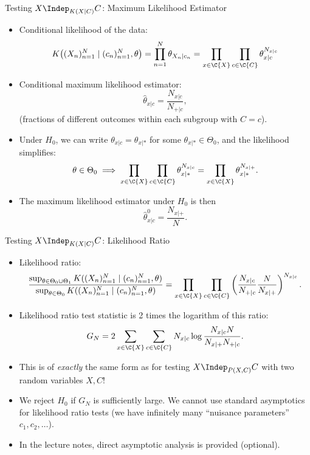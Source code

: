 \begin{frame}{Testing $X \Indep_{K(X|C)} C$: Maximum Likelihood Estimator}
  \begin{itemize}
    \item Conditional likelihood of the data:
      $$K\big((X_n)_{n=1}^N \mid (c_n)_{n=1}^N, \theta\big)
      = \prod_{n=1}^N \theta_{X_n|c_n} 
      = \prod_{x\in\C{X}} \prod_{c\in\C{C}} \theta_{x|c}^{N_{x|c}}$$
    \item Conditional maximum likelihood estimator:
      $$\hat \theta_{x|c} = \frac{N_{x|c}}{N_{+|c}},$$
      (fractions of different outcomes within each subgroup with $C = c$).
    \item Under $H_0$, we can write $\theta_{x|c} = \theta_{x|\ast}$ for some $\theta_{x|\ast} \in \Theta_0$, 
      and the likelihood simplifies:
      $$\theta \in \Theta_0 \implies \prod_{x\in\C{X}} \prod_{c\in\C{C}} \theta_{x|\ast}^{N_{x|c}} = \prod_{x\in\C{X}} \theta_{x|\ast}^{N_{x|+}}.$$
    \item The maximum likelihood estimator under $H_0$ is then
$$\hat \theta^0_{x|c} = \frac{N_{x|+}}{N}.$$
  \end{itemize}
\end{frame}
 
\begin{frame}{Testing $X \Indep_{K(X|C)} C$: Likelihood Ratio}
  \begin{itemize}
    \item Likelihood ratio:
\begin{equation*}
  \frac{\sup_{\theta\in\Theta_0 \cup \Theta_1} K((X_n)_{n=1}^N \mid (c_n)_{n=1}^N, \theta)}{\sup_{\theta\in\Theta_0} K((X_n)_{n=1}^N \mid (c_n)_{n=1}^N, \theta)}
= \prod_{x\in\C{X}} \prod_{c\in\C{C}} \left(\frac{N_{x|c}}{N_{+|c}} \frac{N}{N_{x|+}}\right)^{N_{x|c}}.
\end{equation*}
    \item Likelihood ratio test statistic is 2 times the logarithm of this ratio:
$$G_N = 2 \sum_{x\in\C{X}} \sum_{c\in\C{C}} N_{x|c} \log \frac{N_{x|c} N}{N_{x|+} N_{+|c}}.$$
    \item This is of \emph{exactly} the same form as for testing $X \Indep_{P(X,C)} C$ with two random variables $X,C$!
    \item We reject $H_0$ if $G_N$ is sufficiently large.
      We cannot use standard asymptotics for likelihood ratio tests (we have infinitely many ``nuisance parameters'' $c_1,c_2,\dots$).
    \item In the lecture notes, direct asymptotic analysis is provided (optional).
  \end{itemize}
\end{frame}

